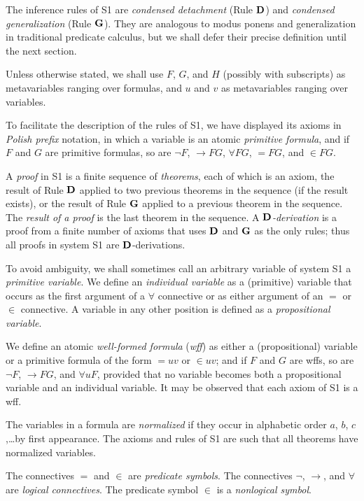 \documentclass[leqno]{article}
\begin{document}
The inference rules of S1 are
  {\em condensed detachment} (Rule ${\bf D}$)  and
  {\em condensed generalization} (Rule ${\bf G}$).
They are analogous to modus ponens and generalization in traditional predicate
calculus, but we shall defer their precise definition until the next section.

     Unless otherwise stated, we shall use $F$, $G$, and $H$ (possibly with
subscripts) as metavariables ranging over formulas, and $u$ and $v$ as
metavariables ranging over variables.

     To facilitate the description of the rules of S1, we have displayed its
axioms in {\em Polish prefix} notation, in which a variable is an atomic {\em
primitive formula}, and if $F$ and $G$ are primitive formulas, so are $\lnot F$,
$\rightarrow FG$, $\forall FG$, $=FG$, and $\in FG$.

     A {\em proof} in S1 is a finite sequence of {\em theorems}, each of which
is an axiom, the result of Rule ${\bf D}$ applied to two previous theorems in
the sequence (if the result exists), or the result of Rule ${\bf G}$ applied
to a previous theorem in the sequence.  The {\em result of a proof} is the
last theorem in the sequence.  A {\em ${\bf D}$-derivation} is a proof from a
finite number of axioms that uses ${\bf D}$ and ${\bf G}$ as the only rules;
thus all proofs in system S1 are ${\bf D}$-derivations.

     To avoid ambiguity, we shall sometimes call an arbitrary variable of
system S1 a {\em primitive variable}.  We define an {\em individual variable}
as a (primitive) variable that occurs as the first argument of a $\forall $
connective or as either argument of an $=$ or $\in $ connective.  A variable
in any other position is defined as a {\em propositional variable}.

     We define an atomic {\em well-formed formula} ({\em wff}) as either a
(propositional) variable or a primitive formula of the form $=uv$ or $\in uv$;
and if $F$ and $G$ are wffs, so are $\lnot F$, $\rightarrow FG$, and $\forall
uF$, provided that no variable becomes both a propositional variable and an
individual variable.  It may be observed that each axiom of S1 is a wff.

     The variables in a formula are {\em normalized} if they occur in
alphabetic order $a$, $b$, $c$,\ldots by first appearance.  The axioms and
rules of S1 are such that all theorems have normalized variables.

     The connectives $=$ and $\in $ are {\em predicate symbols}.  The
connectives $\lnot $, $\rightarrow $, and $\forall $ are {\em logical
connectives}.  The predicate symbol $\in $ is a {\em nonlogical symbol}.
\end{document}
